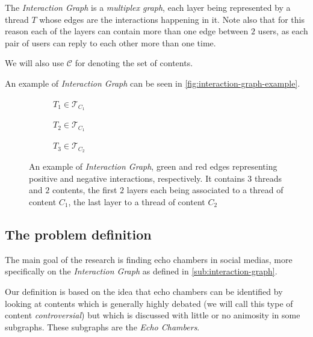 The \emph{Interaction Graph} is a \emph{multiplex graph}, each layer being
represented by a thread $T$ whose edges are the interactions happening in it.
Note also that for this reason each of the layers can contain more than one
edge between $2$ users, as each pair of users can reply to each other more than
one time.

We will also use $\mathcal{C} $ for denoting the set of contents.

An example of \emph{Interaction Graph} can be seen in
\autoref{fig:interaction-graph-example}.

\begin{figure}
	\begin{center}
		\begin{subfigure}[b]{0.3\textwidth}
			\centering
			\caption{$T_{1} \in \mathcal{T}_{C_{1}} $}
			\label{fig:tex/tikz/graph_thread1.tikz}
		\end{subfigure}
		\begin{subfigure}[b]{0.3\textwidth}
			\centering
			\caption{$T_{2} \in \mathcal{T}_{C_{1}} $}
			\label{fig:tex/tikz/graph_thread2.tikz}
		\end{subfigure}
		\begin{subfigure}[b]{0.3\textwidth}
			\centering
			\caption{$T_{3} \in \mathcal{T}_{C_{2}} $}
			\label{fig:tex/tikz/graph_thread3.tikz}
		\end{subfigure}
	\end{center}
	\caption[Example \emph{Interaction Graph}]{An example of \emph{Interaction Graph}, green and red edges
		representing positive and negative interactions, respectively. It
		contains $3$ threads and $2$ contents, the first $2$ layers each being
		associated to a thread of content $C_{1} $, the last layer to a thread
		of content $C_{2} $}
	\label{fig:interaction-graph-example}
\end{figure}

\subsection{The problem definition}%
\label{sub:the_problem_definition}

The main goal of the research is finding echo chambers in social medias, more
specifically on the \emph{Interaction Graph} as defined in
\autoref{sub:interaction-graph}.

Our definition is based on the idea that echo chambers can be identified by
looking at contents which is generally highly debated (we will call
this type of content \emph{controversial}) but which is discussed with little
or no animosity in some subgraphs. These subgraphs are the \emph{Echo
	Chambers}.

